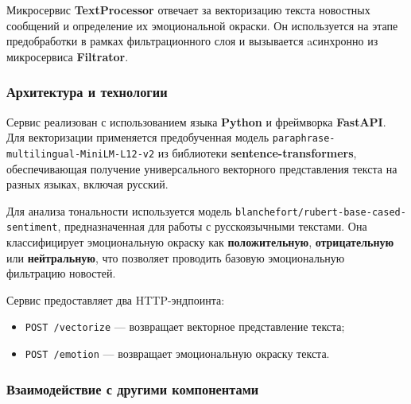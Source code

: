 Микросервис \textbf{TextProcessor} отвечает за векторизацию текста
новостных сообщений и определение их эмоциональной окраски. Он
используется на этапе предобработки в рамках фильтрационного слоя и
вызывается aсинхронно из микросервиса \textbf{Filtrator}.

\hypertarget{ux430ux440ux445ux438ux442ux435ux43aux442ux443ux440ux430-ux438-ux442ux435ux445ux43dux43eux43bux43eux433ux438ux438}{%
\subsubsection{\texorpdfstring{\textbf{Архитектура и
технологии}}{Архитектура и технологии}}\label{ux430ux440ux445ux438ux442ux435ux43aux442ux443ux440ux430-ux438-ux442ux435ux445ux43dux43eux43bux43eux433ux438ux438}}

Сервис реализован с использованием языка \textbf{Python} и фреймворка
\textbf{FastAPI}. Для векторизации применяется предобученная модель
\texttt{paraphrase-multilingual-MiniLM-L12-v2} из библиотеки
\textbf{sentence-transformers}, обеспечивающая получение универсального
векторного представления текста на разных языках, включая русский.

Для анализа тональности используется модель
\texttt{blanchefort/rubert-base-cased-sentiment}, предназначенная для
работы с русскоязычными текстами. Она классифицирует эмоциональную
окраску как \textbf{положительную}, \textbf{отрицательную} или
\textbf{нейтральную}, что позволяет проводить базовую эмоциональную
фильтрацию новостей.

Сервис предоставляет два HTTP-эндпоинта:

\begin{itemize}
\tightlist
\item
  \texttt{POST\ /vectorize} --- возвращает векторное представление
  текста;\\
\item
  \texttt{POST\ /emotion} --- возвращает эмоциональную окраску текста.
\end{itemize}

\hypertarget{ux432ux437ux430ux438ux43cux43eux434ux435ux439ux441ux442ux432ux438ux435-ux441-ux434ux440ux443ux433ux438ux43cux438-ux43aux43eux43cux43fux43eux43dux435ux43dux442ux430ux43cux438}{%
\subsubsection{\texorpdfstring{\textbf{Взаимодействие с другими
компонентами}}{Взаимодействие с другими компонентами}}\label{ux432ux437ux430ux438ux43cux43eux434ux435ux439ux441ux442ux432ux438ux435-ux441-ux434ux440ux443ux433ux438ux43cux438-ux43aux43eux43cux43fux43eux43dux435ux43dux442ux430ux43cux438}}

